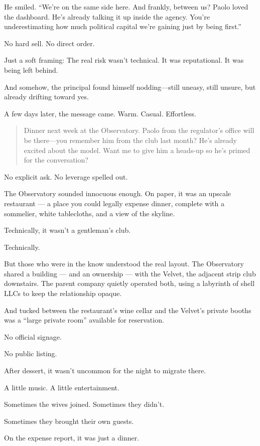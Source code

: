 He smiled. “We’re on the same side here. And frankly, between us? Paolo loved the dashboard. He’s already talking it up inside the agency. You’re underestimating how much political capital we’re gaining just by being first.”

No hard sell.  
No direct order.

Just a soft framing:  
The real risk wasn’t technical.  
It was reputational.  
It was being left behind.

And somehow, the principal found himself nodding—still uneasy, still unsure, but already drifting toward yes.

A few days later, the message came.  
Warm. Casual. Effortless.

\begin{quote}
Dinner next week at the Observatory. Paolo from the regulator’s office will be there—you remember him from the club last month? He’s already excited about the model. Want me to give him a heads-up so he’s primed for the conversation?
\end{quote}

No explicit ask. No leverage spelled out.

The Observatory sounded innocuous enough. On paper, it was an upscale restaurant --- a place you could legally expense dinner, complete with a sommelier, white tablecloths, and a view of the skyline.  

Technically, it wasn’t a gentleman’s club.  

Technically.

But those who were in the know understood the real layout. The Observatory shared a building --- and an ownership --- with the Velvet, the adjacent strip club downstairs. The parent company quietly operated both, using a labyrinth of shell LLCs to keep the relationship opaque.

And tucked between the restaurant’s wine cellar and the Velvet’s private booths was a “large private room” available for reservation.  

No official signage.  

No public listing.  

After dessert, it wasn’t uncommon for the night to migrate there.  

A little music. A little entertainment.  

Sometimes the wives joined. Sometimes they didn’t.  

Sometimes they brought their own guests.

On the expense report, it was just a dinner.  

